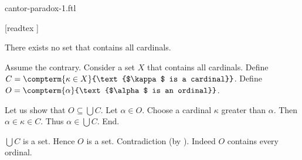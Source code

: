 \documentclass{article}
\begin{document}
\begin{smodule}{cantor-paradox-1.ftl}

  \begin{forthel}
    [readtex ]
  \end{forthel}

  \begin{ftheorem*}[label=cantor_paradox_1,title=Cantor's First Paradox]
    There exists no set that contains all cardinals.
  \end{ftheorem*}
  \begin{fproof}
    Assume the contrary.
    Consider a set $X$ that contains all cardinals.
    Define $C = \compterm{\kappa \in X}{\text{$\kappa$ is a cardinal}}$.
    Define $O = \compterm{\alpha}{\text{$\alpha$ is an ordinal}}$.

    Let us show that $O \subseteq \bigcup C$.
      Let $\alpha \in O$.
      Choose a cardinal $\kappa$ greater than $\alpha$.
      Then $\alpha \in \kappa \in C$.
      Thus $\alpha \in \bigcup C$.
    End.

    $\bigcup C$ is a set.
    Hence $O$ is a set.
    Contradiction (by ).
    Indeed $O$ contains every ordinal.
  \end{fproof}
\end{smodule}
\end{document}

